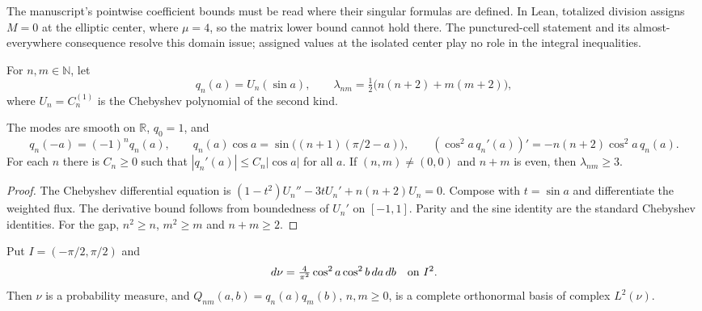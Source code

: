 \begin{remark}
The manuscript's pointwise coefficient bounds must be read where their
singular formulas are defined. In Lean, totalized division assigns
$M=0$ at the elliptic center, where $\mu=4$, so the matrix lower bound
cannot hold there. The punctured-cell statement and its almost-everywhere
consequence resolve this domain issue; assigned values at the isolated
center play no role in the integral inequalities.
\end{remark}

\begin{definition}
\label{def:zonal-modes}
\leanok
For $n,m\in\mathbb N$, let
\[
 q_n(a)=U_n(\sin a),\qquad
 \lambda_{nm}=\tfrac12\bigl(n(n+2)+m(m+2)\bigr),
\]
where $U_n=C_n^{(1)}$ is the Chebyshev polynomial of the second kind.
\end{definition}

\begin{lemma}
\label{lem:zonal-mode-identities}
\leanok
The modes are smooth on $\mathbb R$, $q_0=1$, and
\[
 q_n(-a)=(-1)^nq_n(a),\qquad
 q_n(a)\cos a=\sin\bigl((n+1)(\pi/2-a)\bigr),\qquad
 (\cos^2a\,q_n'(a))'=-n(n+2)\cos^2a\,q_n(a).
\]
For each $n$ there is $C_n\ge0$ such that
$|q_n'(a)|\le C_n|\cos a|$ for all $a$.
If $(n,m)\ne(0,0)$ and $n+m$ is even, then $\lambda_{nm}\ge3$.
\end{lemma}

\begin{proof}
\leanok
The Chebyshev differential equation is
$(1-t^2)U_n''-3tU_n'+n(n+2)U_n=0$.
Compose with $t=\sin a$ and differentiate the weighted flux.
The derivative bound follows from boundedness of $U_n'$ on $[-1,1]$.
Parity and the sine identity are the standard Chebyshev identities.
For the gap, $n^2\ge n$, $m^2\ge m$ and $n+m\ge2$.
\end{proof}

\begin{lemma}
\label{lem:zonal-mode-basis}
\leanok
Put $I=(-\pi/2,\pi/2)$ and
\[
 d\nu=\tfrac4{\pi^2}\cos^2a\cos^2b\,da\,db
 \quad\hbox{on }I^2.
\]
Then $\nu$ is a probability measure, and
$Q_{nm}(a,b)=q_n(a)q_m(b)$, $n,m\ge0$, is a complete orthonormal
basis of complex $L^2(\nu)$.
\end{lemma}

